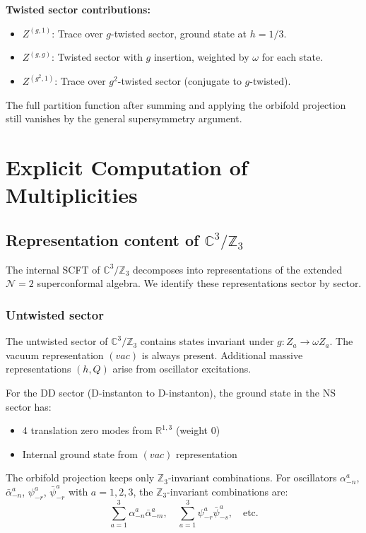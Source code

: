 \documentclass[11pt]{article}
\newcommand{\Z}{\mathbb{Z}}
\newcommand{\C}{\mathbb{C}}
\newcommand{\R}{\mathbb{R}}
\newcommand{\NN}{\mathcal{N}}
\begin{document}
\textbf{Twisted sector contributions:}
\begin{itemize}
\item $Z^{(g,1)}$: Trace over $g$-twisted sector, ground state at $h = 1/3$.
\item $Z^{(g,g)}$: Twisted sector with $g$ insertion, weighted by $\omega$ for each state.
\item $Z^{(g^2, 1)}$: Trace over $g^2$-twisted sector (conjugate to $g$-twisted).
\end{itemize}

The full partition function after summing and applying the orbifold projection still vanishes by the general supersymmetry argument.

\section{Explicit Computation of Multiplicities}\label{app:mult}

\subsection{Representation content of $\C^3/\Z_3$}

The internal SCFT of $\C^3/\Z_3$ decomposes into representations of the extended $\NN=2$ superconformal algebra. We identify these representations sector by sector.

\subsubsection{Untwisted sector}

The untwisted sector of $\C^3/\Z_3$ contains states invariant under $g: Z_a \to \omega Z_a$. The vacuum representation $(vac)$ is always present. Additional massive representations $(h,Q)$ arise from oscillator excitations.

For the DD sector (D-instanton to D-instanton), the ground state in the NS sector has:
\begin{itemize}
\item 4 translation zero modes from $\R^{1,3}$ (weight 0)
\item Internal ground state from $(vac)$ representation
\end{itemize}

The orbifold projection keeps only $\Z_3$-invariant combinations. For oscillators $\alpha^a_{-n}$, $\bar{\alpha}^a_{-n}$, $\psi^a_{-r}$, $\bar{\psi}^a_{-r}$ with $a = 1,2,3$, the $\Z_3$-invariant combinations are:
\begin{equation}
\sum_{a=1}^3 \alpha^a_{-n} \bar{\alpha}^a_{-m}, \quad \sum_{a=1}^3 \psi^a_{-r} \bar{\psi}^a_{-s}, \quad \text{etc.}
\end{equation}
\end{document}
